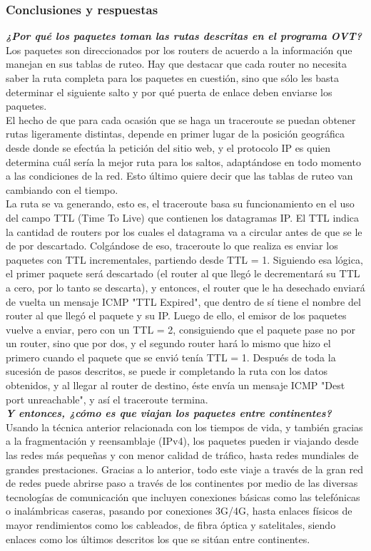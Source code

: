 \documentclass[12pt]{article}
\begin{document}
\subsubsection{Conclusiones y respuestas}
\textbf{\textit{¿Por qué los paquetes toman las rutas descritas en el programa OVT?}} Los paquetes son direccionados por los routers de acuerdo a la información que manejan en sus tablas de ruteo. Hay que destacar que cada router no necesita saber la ruta completa para los paquetes en cuestión, sino que sólo les basta determinar el siguiente salto y por qué puerta de enlace deben enviarse los paquetes.\\

El hecho de que para cada ocasión que se haga un traceroute se puedan obtener rutas ligeramente distintas, depende en primer lugar de la posición geográfica desde donde se efectúa la petición del sitio web, y el protocolo IP es quien determina cuál sería la mejor ruta para los saltos, adaptándose en todo momento a las condiciones de la red. Esto último quiere decir que las tablas de ruteo van cambiando con el tiempo.\\

La ruta se va generando, esto es, el traceroute basa su funcionamiento en el uso del campo TTL (Time To Live) que contienen los datagramas IP. El TTL indica la cantidad de routers por los cuales el datagrama va a circular antes de que se le de por descartado. Colgándose de eso, traceroute lo que realiza es enviar los paquetes con TTL incrementales, partiendo desde TTL = 1. Siguiendo esa lógica, el primer paquete será descartado (el router al que llegó le decrementará su TTL a cero, por lo tanto se descarta), y entonces, el router que le ha desechado enviará de vuelta un mensaje ICMP "TTL Expired", que dentro de sí tiene el nombre del router al que llegó el paquete y su IP. Luego de ello, el emisor de los paquetes vuelve a enviar, pero con un TTL = 2, consiguiendo que el paquete pase no por un router, sino que por dos, y el segundo router hará lo mismo que hizo el primero cuando el paquete que se envió tenía TTL = 1. Después de toda la sucesión de pasos descritos, se puede ir completando la ruta con los datos obtenidos, y al llegar al router de destino, éste envía un mensaje ICMP "Dest port unreachable", y así el traceroute termina.\\

\textbf{\textit{Y entonces, ¿cómo es que viajan los paquetes entre continentes?}} Usando la técnica anterior relacionada con los tiempos de vida, y también gracias a la fragmentación y reensamblaje (IPv4), los paquetes pueden ir viajando desde las redes más pequeñas y con menor calidad de tráfico, hasta redes mundiales de grandes prestaciones. Gracias a lo anterior, todo este viaje a través de la gran red de redes puede abrirse paso a través de los continentes por medio de las diversas tecnologías de comunicación que incluyen conexiones básicas como las telefónicas o inalámbricas caseras, pasando por conexiones 3G/4G, hasta enlaces físicos de mayor rendimientos como los cableados, de fibra óptica y satelitales, siendo enlaces como los últimos descritos los que se sitúan entre continentes.\\
\end{document}
